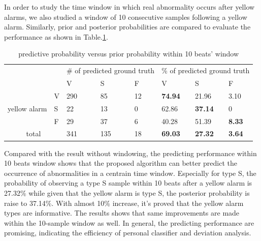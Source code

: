 In order to study the time window in which real abnormality occurs after yellow alarms, we also studied a window of 10 consecutive samples following a yellow alarm. Similarly, prior and posterior probabilities are compared to evaluate the performance as shown in Table.\ref{table:pred10}. 


\begin{table}[t]
\centering
\caption{predictive probability versus prior probability within 10 beats' window}
\label{table:pred10}
\begin{tabular}{|c|l|l|l|l||l|l|l|}
\hline
\multicolumn{2}{|l|}{\multirow{2}{*}{}} & \multicolumn{3}{l|}{\# of predicted ground truth} & \multicolumn{3}{l|}{\% of predicted ground truth} \\ \cline{3-8} 
\multicolumn{2}{|l|}{}                  & V               & S               & F             & V               & S               & F             \\ \hline
\multirow{3}{*}{yellow alarm}    & V    & 290             & 85              & 12            & \textbf{74.94}  & 21.96           & 3.10          \\ \cline{2-8} 
                                 & S    & 22              & 13              & 0             & 62.86           & \textbf{37.14}  & 0             \\ \cline{2-8} 
                                 & F    & 29              & 37              & 6             & 40.28           & 51.39           & \textbf{8.33} \\ \hline
\multicolumn{2}{|c|}{total}             & 341             & 135             & 18            & \textbf{69.03}  & \textbf{27.32}  & \textbf{3.64} \\ \hline
\end{tabular}
\end{table}

Compared with the result without windowing, the predicting performance within 10 beats window shows that the proposed algorithm can better predict the occurrence of abnormalities in a centrain time window. Especially for type S, the probability of observing a type S sample within 10 beats after a yellow alarm is 27.32\% while given that the yellow alarm is type S, the posterior probability is raise to 37.14\%. With almost 10\% increase, it's proved that the yellow alarm types are informative. The results shows that same improvements are made within the 10-sample window as well. In general, the predicting performance are promising, indicating the efficiency of personal classifier and deviation analysis.